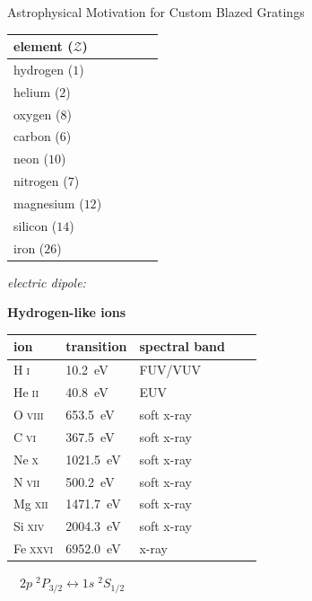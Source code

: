 \documentclass[aspectratio=169,9pt]{beamer}
\newcommand\ion[2]{#1$\;${\scshape{#2}}}%
\begin{document}
\begin{frame}{Astrophysical Motivation for Custom Blazed Gratings}
\begin{minipage}[t]{0.2\linewidth} 
\vspace{3.3mm}
\begin{table}[]
 \centering
 \begin{tabular}{@{}lllll@{}} 
 \toprule
 element ($\mathcal{Z}$) \\ \midrule
 hydrogen ($1$) \\
 helium ($2$) \\
 oxygen ($8$) \\
 carbon ($6$) \\
 neon ($10$) \\
 nitrogen ($7$) \\
 magnesium ($12$) \\
 silicon ($14$) \\
 iron ($26$) \\
 \bottomrule
 \end{tabular}
 \end{table}
{\quad \emph{electric dipole:}}
 \end{minipage}
\begin{minipage}[t]{0.38\linewidth} 
{\quad \textbf{Hydrogen-like ions}}
\begin{table}[]
 \centering
 \begin{tabular}{@{}lllll@{}} 
 \toprule
 ion & transition & spectral band \\ \midrule
 \ion{H}{i} & \SI{10.2}{\electronvolt} & FUV/VUV \\
 \ion{He}{ii} & \SI{40.8}{\electronvolt} & EUV \\
 \ion{O}{viii} & \SI{653.5}{\electronvolt} & soft x-ray \\
 \ion{C}{vi} & \SI{367.5}{\electronvolt} & soft x-ray \\
 \ion{Ne}{x} & \SI{1021.5}{\electronvolt} & soft x-ray \\
 \ion{N}{vii} & \SI{500.2}{\electronvolt} & soft x-ray \\
 \ion{Mg}{xii} & \SI{1471.7}{\electronvolt} & soft x-ray \\
 \ion{Si}{xiv} & \SI{2004.3}{\electronvolt} & soft x-ray \\
 \ion{Fe}{xxvi} & \SI{6952.0}{\electronvolt} & x-ray \\
 \bottomrule
 \end{tabular}
 \end{table}
$\quad 2 p \; {}^2 \! P_{3/2} \leftrightarrow 1 s \; {}^2 \! S_{1/2}$

\end{minipage}
\end{frame}
\end{document}
